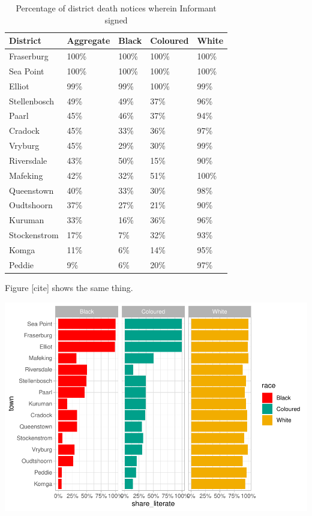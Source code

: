 \documentclass[fleqn,10pt,lineno]{wlpeerj} %
\begin{document}
\begin{table}

\caption{\label{tab:unnamed-chunk-19}Percentage of district death notices wherein Informant signed}
\centering
\begin{tabular}[t]{l|l|l|l|l}
\hline
District & Aggregate & Black & Coloured & White\\
\hline
Fraserburg & 100\% & 100\% & 100\% & 100\%\\
\hline
Sea Point & 100\% & 100\% & 100\% & 100\%\\
\hline
Elliot & 99\% & 99\% & 100\% & 99\%\\
\hline
Stellenbosch & 49\% & 49\% & 37\% & 96\%\\
\hline
Paarl & 45\% & 46\% & 37\% & 94\%\\
\hline
Cradock & 45\% & 33\% & 36\% & 97\%\\
\hline
Vryburg & 45\% & 29\% & 30\% & 99\%\\
\hline
Riversdale & 43\% & 50\% & 15\% & 90\%\\
\hline
Mafeking & 42\% & 32\% & 51\% & 100\%\\
\hline
Queenstown & 40\% & 33\% & 30\% & 98\%\\
\hline
Oudtshoorn & 37\% & 27\% & 21\% & 90\%\\
\hline
Kuruman & 33\% & 16\% & 36\% & 96\%\\
\hline
Stockenstrom & 17\% & 7\% & 32\% & 93\%\\
\hline
Komga & 11\% & 6\% & 14\% & 95\%\\
\hline
Peddie & 9\% & 6\% & 20\% & 97\%\\
\hline
\end{tabular}
\end{table}

Figure {[}cite{]} shows the same thing.

\includegraphics{spanish-flu-mortality_bookdown_files/figure-latex/unnamed-chunk-20-1.pdf}
\end{document}
